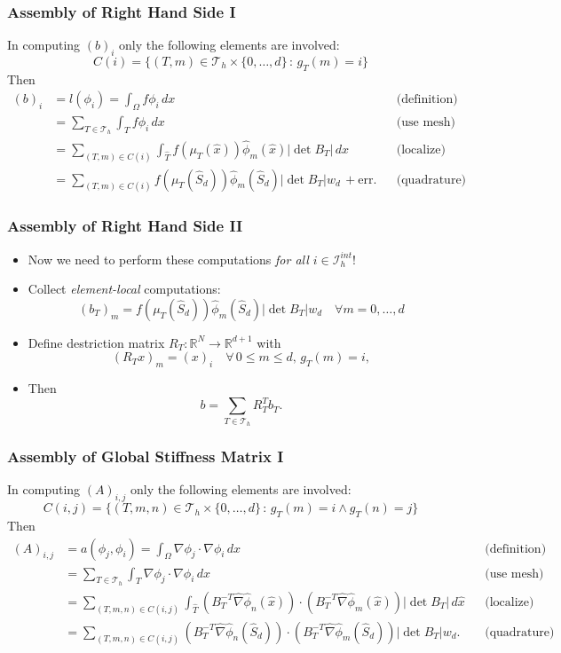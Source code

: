 \documentclass[ignorenonframetext,11pt]{beamer}
\theoremstyle{definition}
\begin{document}
\begin{frame}
\frametitle{Assembly of Right Hand Side I}
In computing $(b)_i$ only the following elements are involved:
$$C(i) = \{(T,m)\in\mathcal{T}_h\times\{0,\ldots,d\} \,:\, g_T(m)=i\}$$
Then
\begin{align*}
(b)_i &= l(\phi_i) = \int_\Omega f \phi_i\,dx &&\text{(definition)} \\
&= \sum_{T\in\mathcal{T}_h} \int_T f \phi_i\,dx &&\text{(use mesh)} \\
&= \sum_{(T,m)\in C(i)} \int_{\hat T} f(\mu_T(\hat x)) \hat\phi_m(\hat x) |\det B_T|\,dx
&&\text{(localize)} \\
&= \sum_{(T,m)\in C(i)}
f(\mu_T(\hat S_d)) \hat\phi_m(\hat S_d) |\det B_T| w_d \, + \text{err}. &&\text{(quadrature)}
\end{align*}
\end{frame}

\begin{frame}
\frametitle{Assembly of Right Hand Side II}
\begin{itemize}
\item Now we need to perform these computations {\em for all $i\in\mathcal{I}_h^{int}$}!
\item Collect {\em element-local} computations:
\begin{equation*}
(b_T)_m =  f(\mu_T(\hat S_d)) \hat\phi_m(\hat S_d) |\det B_T| w_d \quad \forall m=0,\ldots,d
\end{equation*}
\item Define {destriction matrix} $R_T : \mathbb{R}^N \to \mathbb{R}^{d+1}$ with
\begin{equation*}
(R_T x)_m = (x)_i \quad \forall \,0\leq m \leq d, \,g_T(m)=i,
\end{equation*}
\item Then
\begin{equation*}
b = \sum_{T\in\mathcal{T}_h} R_T^T b_T .
\end{equation*}
\end{itemize}
\end{frame}

\begin{frame}
\frametitle{Assembly of Global Stiffness Matrix I}
In computing $(A)_{i,j}$ only the following elements are involved:
$$C(i,j) = \{(T,m,n)\in\mathcal{T}_h\times\{0,\ldots,d\} \,:\, g_T(m)=i \wedge g_T(n)=j\}$$
Then
{\small\begin{align*}
(A)_{i,j} &= a(\phi_j,\phi_i) = \int_\Omega \nabla \phi_j \cdot \nabla \phi_i \,dx
&&\text{(definition)}\\
&= \sum_{T\in\mathcal{T}_h} \int_T \nabla \phi_j \cdot \nabla \phi_i \,dx
&&\text{(use mesh)}\\
&= \sum_{(T,m,n)\in C(i,j)}
\int_{\hat T} (B_T^{-T} \hat\nabla\hat\phi_n(\hat x))\cdot (B_T^{-T} \hat\nabla\hat\phi_m(\hat x))
|\det B_T| \,d\hat x &&\text{(localize)}\\
&= \sum_{(T,m,n)\in C(i,j)}
(B_T^{-T} \hat\nabla\hat\phi_n(\hat S_d))\cdot (B_T^{-T} \hat\nabla\hat\phi_m(\hat S_d))
|\det B_T| w_d . &&\text{(quadrature)}
\end{align*}}
\end{frame}
\end{document}
